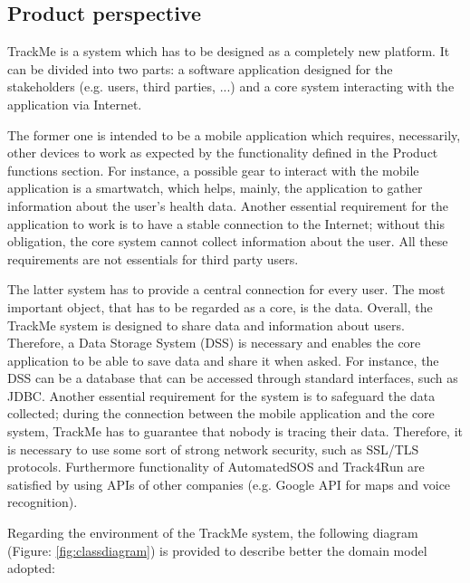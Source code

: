 \subsection{Product perspective}
TrackMe is a system which has to be designed as a completely new platform. It can be divided into 
two parts: a software application designed for the stakeholders (e.g. users, third parties, ...) and a 
core system interacting with the application via Internet. 
\par
The former one is intended to be a mobile application which requires, necessarily, other devices to work 
as expected by the functionality defined in the Product functions section. For instance, a possible gear 
to interact with the mobile application is a smartwatch, which helps, mainly, the application to 
gather information about the user's health data. Another essential requirement for the application to 
work is to have a stable connection to the Internet; without this obligation, the core system cannot 
collect information about the user. All these requirements are not essentials for third party users.
\par
The latter system has to provide a central connection for every user. The most important object, that has 
to be regarded as a core, is the data. Overall, the TrackMe system is designed to share data and 
information about users. Therefore, a Data Storage System (DSS) is necessary and enables the 
core application to be able to save data and share it when asked. For instance, the DSS can be a 
database that can be accessed through standard interfaces, such as JDBC. Another essential 
requirement for the system is to safeguard the data collected; during the connection between the 
mobile application and the core system, TrackMe has to guarantee that nobody is tracing their data. 
Therefore, it is necessary to use some sort of strong network security, such as SSL/TLS protocols. 
Furthermore functionality of AutomatedSOS and Track4Run are satisfied by using APIs of other companies 
(e.g. Google API for maps and voice recognition).
\\\par
Regarding the environment of the TrackMe system, the following diagram (Figure: \ref{fig:classdiagram}) 
is provided to describe better the domain model adopted:\\

